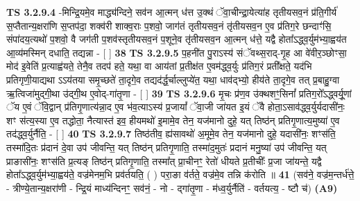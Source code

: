 \documentclass[17pt]{extarticle}
\begin{document}
                  \newline
                                \textbf{ TS 3.2.9.4} \newline
                  -मिन्द्रि॒यमे॒व माद्ध्य॑न्दिने॒ सव॑न आ॒त्मन् ध॑त्त उ॒क्थं ॅवा॒चीन्द्रा॒येत्या॑ह तृतीयसव॒नं प्र॑ति॒गीर्य॑ स॒प्तैतान्य॒क्षरा॑णि स॒प्तप॑दा॒ शक्व॑री शाक्व॒राः प॒शवो॒ जाग॑तं तृतीयसव॒नं तृ॑तीयसव॒न ए॒व प्र॑तिग॒रे छन्दाꣳ॑सि॒ संपा॑दय॒त्यथो॑ प॒शवो॒ वै जग॑ती प॒शव॑स्तृतीयसव॒नं प॒शूने॒व तृ॑तीयसव॒न आ॒त्मन् ध॑त्ते॒ यद्वै होता᳚ऽद्ध्व॒र्युम॑भ्या॒ह्वय॑त आ॒व्य॑मस्मिन् दधाति॒ तद्यन्ना - [  ] \textbf{  38} \newline
                  \newline
                                \textbf{ TS 3.2.9.5} \newline
                  प॒हनी॑त पु॒राऽस्य॑ संॅवथ्स॒राद्-गृ॒ह आ वे॑वीर॒ञ्छोꣳसा॒ मोद॑ इ॒वेति॑ प्र॒त्याह्व॑यते॒ तेनै॒व तदप॑ हते॒ यथा॒ वा आय॑तां प्र॒तीक्ष॑त ए॒वम॑द्ध्व॒र्युः प्र॑तिग॒रं प्रती᳚क्षते॒ यद॑भि प्रतिगृणी॒याद्यथा ऽऽय॑तया समृ॒च्छते॑ ता॒दृगे॒व तद्यद॑र्द्ध॒र्चाल्लुप्ये॑त॒ यथा॒ धाव॑द्भ्यो॒ हीय॑ते ता॒दृगे॒व तत् प्र॒बाहु॒ग्वा ऋ॒त्विजा॑मुद्गी॒था उ॑द्गी॒थ ए॒वोद्-गा॑तृ॒णा - [  ] \textbf{  39} \newline
                  \newline
                                \textbf{ TS 3.2.9.6} \newline
                  मृ॒चः प्र॑ण॒व उ॑क्थशꣳ॒॒सिनां᳚ प्रतिग॒रो᳚ऽद्ध्वर्यू॒णां ॅय ए॒वं ॅवि॒द्वान् प्र॑तिगृ॒णात्य॑न्ना॒द ए॒व भ॑व॒त्याऽस्य॑ प्र॒जायां᳚ ॅवा॒जी जा॑यत इ॒यं ॅवै होता॒ऽसाव॑द्ध्व॒र्युर्यदासी॑नः॒ शꣳ स॑त्य॒स्या ए॒व तद्धोता॒ नैत्यास्त॑ इव॒ हीयमथो॑ इ॒मामे॒व तेन॒ यज॑मानो दुहे॒ यत् तिष्ठ॑न् प्रतिगृ॒णात्य॒मुष्या॑ ए॒व तद॑द्ध्व॒र्युर्नैति॒ - [  ] \textbf{  40} \newline
                  \newline
                                \textbf{ TS 3.2.9.7} \newline
                  तिष्ठ॑तीव॒ ह्य॑सावथो॑ अ॒मूमे॒व तेन॒ यज॑मानो दुहे॒ यदासी॑नः॒ शꣳस॑ति॒ तस्मा॑दि॒तः प्र॑दानं दे॒वा उप॑ जीवन्ति॒ यत् तिष्ठ॑न् प्रतिगृ॒णाति॒ तस्मा॑द॒मुतः॑ प्रदानं मनु॒ष्या॑ उप॑ जीवन्ति॒ यत् प्राङासी॑नः॒ शꣳस॑ति प्र॒त्यङ् तिष्ठ॑न् प्रतिगृ॒णाति॒ तस्मा᳚त् प्रा॒चीनꣳ॒॒ रेतो॑ धीयते प्र॒तीचीः᳚ प्र॒जा जा॑यन्ते॒ यद्वै होता᳚ऽद्ध्व॒र्युम॑भ्या॒ह्वय॑ते॒ वज्र॑मेनम॒भि प्रव॑र्तयति॒ ( ) परा॒ङा व॑र्तते॒ वज्र॑मे॒व तन्नि क॑रोति ॥ \textbf{  41} \newline
                  \newline
                      (सव॑ने॒ वज्र॑म॒न्तर्ध॑त्ते॒ - त्रीण्ये॒तान्य॒क्षरा॑णी - न्द्रि॒यं माध्य॑न्दिनꣳ॒॒ सव॑नं॒ - नो - द्गा॑तृ॒णा - म॑ध्व॒र्युर्नैति॑ - वर्तयत्य॒ - ष्टौ च॑)  \textbf{(A9)} \newline \newline
\end{document}
